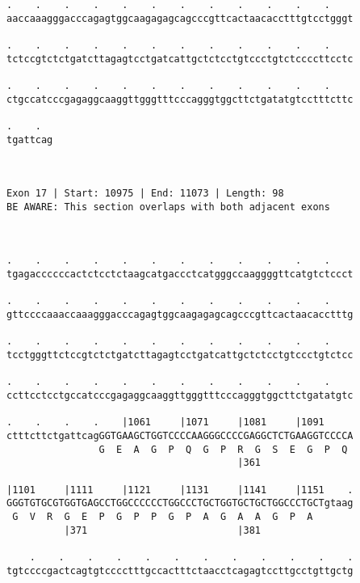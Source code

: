 \documentclass{article}
\begin{document}
\begin{Verbatim}
.    .    .    .    .    .    .    .    .    .    .    .    
aaccaaagggacccagagtggcaagagagcagcccgttcactaacacctttgtcctgggt
                                                            
.    .    .    .    .    .    .    .    .    .    .    .    
tctccgtctctgatcttagagtcctgatcattgctctcctgtccctgtctccccttcctc
                                                            
.    .    .    .    .    .    .    .    .    .    .    .    
ctgccatcccgagaggcaaggttgggtttcccagggtggcttctgatatgtcctttcttc
                                                            
.    .  
tgattcag
        
        
 
Exon 17 | Start: 10975 | End: 11073 | Length: 98
BE AWARE: This section overlaps with both adjacent exons



.    .    .    .    .    .    .    .    .    .    .    .    
tgagaccccccactctcctctaagcatgaccctcatgggccaaggggttcatgtctccct
                                                            
.    .    .    .    .    .    .    .    .    .    .    .    
gttccccaaaccaaagggacccagagtggcaagagagcagcccgttcactaacacctttg
                                                            
.    .    .    .    .    .    .    .    .    .    .    .    
tcctgggttctccgtctctgatcttagagtcctgatcattgctctcctgtccctgtctcc
                                                            
.    .    .    .    .    .    .    .    .    .    .    .    
ccttcctcctgccatcccgagaggcaaggttgggtttcccagggtggcttctgatatgtc
                                                            
.    .    .    .    |1061     |1071     |1081     |1091     
ctttcttctgattcagGGTGAAGCTGGTCCCCAAGGGCCCCGAGGCTCTGAAGGTCCCCA
                G  E  A  G  P  Q  G  P  R  G  S  E  G  P  Q 
                                        |361                
  
|1101     |1111     |1121     |1131     |1141     |1151    .
GGGTGTGCGTGGTGAGCCTGGCCCCCCTGGCCCTGCTGGTGCTGCTGGCCCTGCTgtaag
 G  V  R  G  E  P  G  P  P  G  P  A  G  A  A  G  P  A       
          |371                          |381                
  
    .    .    .    .    .    .    .    .    .    .    .    .
tgtccccgactcagtgtcccctttgccactttctaacctcagagtccttgcctgttgctg
                                                            

\end{Verbatim}
\end{document}
